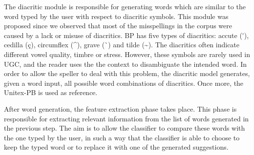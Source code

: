 The diacritic module is responsible for generating words which are similar to the word typed by the user with respect to diacritic symbols. This module was proposed since we observed that most of the misspellings in the corpus were caused by a lack or misuse of diacritics. BP has
five types of diacritics: accute (\'{}), cedilla (ç), circumflex (\^{}), grave (\`{}) and tilde (\~{}). The diacritics often indicate different vowel quality, timbre or stress. However, these symbols are rarely used in UGC, and the reader uses the the context to  disambiguate the intended word. In order to allow the speller to deal with this problem, the diacritic model generates, given a word input, all possible word combinations of diacritics. Once more, the Unitex-PB is used as reference. 

After word generation, the feature extraction phase takes place. This phase is responsible  for extracting relevant information from the list of words generated in the previous step. The aim is to allow the classifier to compare these words with the one typed by the user, in such a way that the classifier is able to choose to keep the typed word or to replace it with one of the generated suggestions. 

